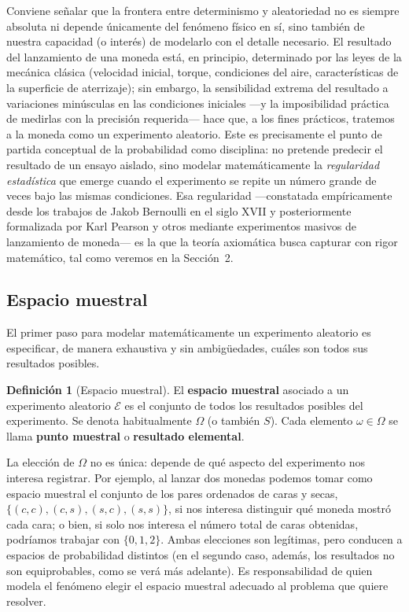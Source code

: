 \documentclass[11pt,a4paper]{article}
\theoremstyle{plain}
\theoremstyle{definition}
\newtheorem{definicion}[teorema]{Definición}
\theoremstyle{remark}
\begin{document}
Conviene señalar que la frontera entre determinismo y aleatoriedad no es siempre absoluta ni depende únicamente del fenómeno físico en sí, sino también de nuestra capacidad (o interés) de modelarlo con el detalle necesario. El resultado del lanzamiento de una moneda está, en principio, determinado por las leyes de la mecánica clásica (velocidad inicial, torque, condiciones del aire, características de la superficie de aterrizaje); sin embargo, la sensibilidad extrema del resultado a variaciones minúsculas en las condiciones iniciales —y la imposibilidad práctica de medirlas con la precisión requerida— hace que, a los fines prácticos, tratemos a la moneda como un experimento aleatorio. Este es precisamente el punto de partida conceptual de la probabilidad como disciplina: no pretende predecir el resultado de un ensayo aislado, sino modelar matemáticamente la \emph{regularidad estadística} que emerge cuando el experimento se repite un número grande de veces bajo las mismas condiciones. Esa regularidad —constatada empíricamente desde los trabajos de Jakob Bernoulli en el siglo XVII y posteriormente formalizada por Karl Pearson y otros mediante experimentos masivos de lanzamiento de moneda— es la que la teoría axiomática busca capturar con rigor matemático, tal como veremos en la Sección~2.

\subsection{Espacio muestral}

El primer paso para modelar matemáticamente un experimento aleatorio es especificar, de manera exhaustiva y sin ambigüedades, cuáles son todos sus resultados posibles.

\begin{definicion}[Espacio muestral]
El \textbf{espacio muestral} asociado a un experimento aleatorio $\mathcal{E}$ es el conjunto de todos los resultados posibles del experimento. Se denota habitualmente $\Omega$ (o también $S$). Cada elemento $\omega \in \Omega$ se llama \textbf{punto muestral} o \textbf{resultado elemental}.
\end{definicion}

La elección de $\Omega$ no es única: depende de qué aspecto del experimento nos interesa registrar. Por ejemplo, al lanzar dos monedas podemos tomar como espacio muestral el conjunto de los pares ordenados de caras y secas, $\{(c,c),(c,s),(s,c),(s,s)\}$, si nos interesa distinguir qué moneda mostró cada cara; o bien, si solo nos interesa el número total de caras obtenidas, podríamos trabajar con $\{0,1,2\}$. Ambas elecciones son legítimas, pero conducen a espacios de probabilidad distintos (en el segundo caso, además, los resultados no son equiprobables, como se verá más adelante). Es responsabilidad de quien modela el fenómeno elegir el espacio muestral adecuado al problema que quiere resolver.
\end{document}
